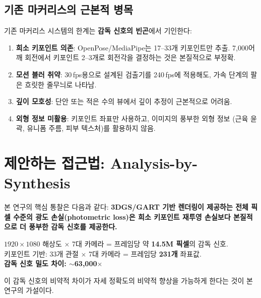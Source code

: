 \documentclass[11pt, a4paper]{report}
\begin{document}
\subsection{기존 마커리스의 근본적 병목}

기존 마커리스 시스템의 한계는 \textbf{감독 신호의 빈곤}에서 기인한다:

\begin{enumerate}[leftmargin=*]
  \item \textbf{희소 키포인트 의존}: OpenPose/MediaPipe는 17--33개 키포인트만 추출.
        7,000\degps 어깨 회전에서 키포인트 2--3개로 회전각을 결정하는 것은 본질적으로 부정확.
  \item \textbf{모션 블러 취약}: 30\,fps용으로 설계된 검출기를 240\,fps에 적용해도,
        가속 단계의 팔은 흐릿한 줄무늬로 나타남.
  \item \textbf{깊이 모호성}: 단안 또는 적은 수의 뷰에서 깊이 추정이 근본적으로 어려움.
  \item \textbf{외형 정보 미활용}: 키포인트 좌표만 사용하고, 이미지의 풍부한 외형 정보
        (근육 윤곽, 유니폼 주름, 피부 텍스처)를 활용하지 않음.
\end{enumerate}


\section{제안하는 접근법: Analysis-by-Synthesis}
\label{sec:proposed_approach}

\begin{keyidea}
본 연구의 핵심 통찰은 다음과 같다:
\textbf{3DGS/GART 기반 렌더링이 제공하는 전체 픽셀 수준의 광도 손실(photometric loss)은
희소 키포인트 재투영 손실보다 본질적으로 더 풍부한 감독 신호를 제공한다.}

\vspace{0.3cm}
\noindent $1920 \times 1080$ 해상도 $\times$ 7대 카메라 = 프레임당 약 \textbf{14.5M 픽셀}의 감독 신호.\\
키포인트 기반: 33개 관절 $\times$ 7대 카메라 = 프레임당 \textbf{231개} 좌표값.\\[0.2cm]
\textbf{감독 신호 밀도 차이: $\sim$63,000$\times$}
\end{keyidea}

이 감독 신호의 비약적 차이가 자세 정확도의 비약적 향상을 가능하게 한다는 것이 본 연구의 가설이다.
\end{document}
